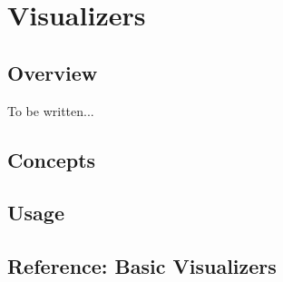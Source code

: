 %
%
%


\section{Visualizers}
\label{section-dv-visualizers}

\subsection{Overview}

To be written...

\subsection{Concepts}

\subsection{Usage}

\subsection{Reference: Basic Visualizers}
